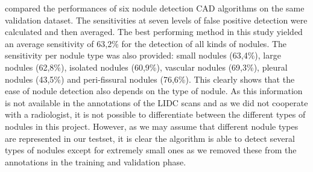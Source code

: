 \cite{ginneken} compared the performances of six nodule detection CAD algorithms
on the same validation dataset. The sensitivities at seven levels of false
positive detection were calculated and then averaged. The best performing method
in this study yielded an average sensitivity of 63,2\% for the detection of all
kinds of nodules. The sensitivity per nodule type was also provided: small
nodules (63,4\%), large nodules (62,8\%), isolated nodules (60,9\%), vascular
nodules (69,3\%), pleural nodules (43,5\%) and peri-fissural nodules (76,6\%).
This clearly shows that the ease of nodule detection also depends on the type of
nodule. As this information is not available in the annotations of the LIDC
scans and as we did not cooperate with a radiologist, it is not possible to
differentiate between the different types of nodules in this project. However,
as we may assume that different nodule types are represented in our testset, it
is clear the algorithm is able to detect several types of nodules except for
extremely small ones as we removed these from the annotations in the training
and validation phase.

